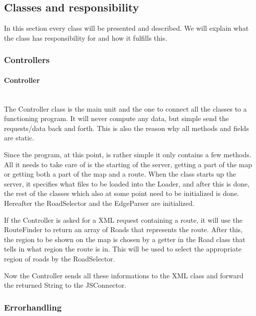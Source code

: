 \documentclass[a4paper,10pt,titlepage]{article}
\begin{document}
		\newpage
		\subsection{Classes and responsibility}
		In this section every class will be presented and described. We will explain what the class has responsibility  for and how it fulfills this. 

			
			\subsubsection{Controllers}
			
				\paragraph{Controller}\mbox{}\\
The Controller class is the main unit and the one to connect all the classes to a functioning program. It will never compute any data, but simple send the requests/data back and forth.  This is also the reason why all methods and fields are static.

Since the program, at this point, is rather simple it only contains a few methods. All it needs to take care of is the starting of the server, getting a part of the map or getting both a part of the map and a route. When the class starts up the server, it specifies what files to be loaded into the Loader, and after this is done, the rest of the classes which also at some point need to be initialized is done. Hereafter the RoadSelector and the EdgeParser are initialized.

If the Controller is asked for a XML request containing a route, it will use the RouteFinder to return an array of Roads that represents the route. After this, the region to be shown on the map is chosen by a getter in the Road class that tells in what region the route is in. This will be used to select the appropriate region of roads by the RoadSelector.

Now the Controller sends all these informations to the XML class and forward the returned String to the JSConnector.


					
			\subsubsection{Errorhandling}
				
\end{document}
